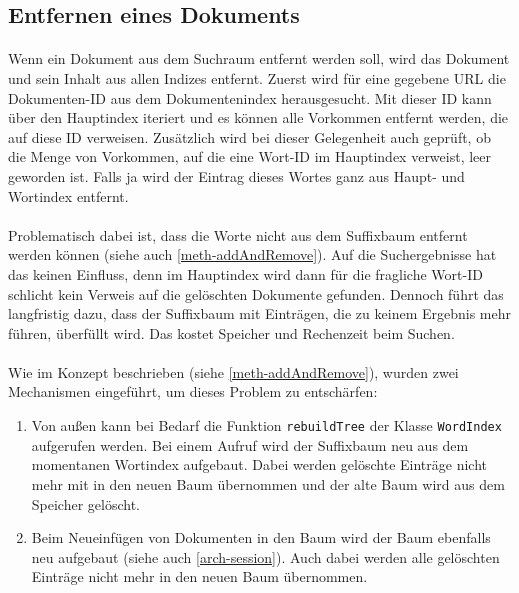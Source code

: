 \newpage

\subsection{Entfernen eines Dokuments}
\label{algo-removeDoc}

\paragraph{} Wenn ein Dokument aus dem Suchraum entfernt werden soll, wird das Dokument und sein Inhalt aus allen Indizes entfernt. Zuerst wird für eine gegebene URL die Dokumenten-ID aus dem Dokumentenindex herausgesucht. Mit dieser ID kann über den Hauptindex iteriert und es können alle Vorkommen entfernt werden, die auf diese ID verweisen. Zusätzlich wird bei dieser Gelegenheit auch geprüft, ob die Menge von Vorkommen, auf die eine Wort-ID im Hauptindex verweist, leer geworden ist. Falls ja wird der Eintrag dieses Wortes ganz aus Haupt- und Wortindex entfernt.
\paragraph{} Problematisch dabei ist, dass die Worte nicht aus dem Suffixbaum entfernt werden können (siehe auch \ref{meth-addAndRemove}). Auf die Suchergebnisse hat das keinen Einfluss, denn im Hauptindex wird dann für die fragliche Wort-ID schlicht kein Verweis auf die gelöschten Dokumente gefunden. Dennoch führt das langfristig dazu, dass der Suffixbaum mit Einträgen, die zu keinem Ergebnis mehr führen, überfüllt wird. Das kostet Speicher und Rechenzeit beim Suchen.
\paragraph{} Wie im Konzept beschrieben (siehe \ref{meth-addAndRemove}), wurden zwei Mechanismen eingeführt, um dieses Problem zu entschärfen:
\begin{enumerate}
 \item Von außen kann bei Bedarf die Funktion \texttt{rebuildTree} der Klasse \texttt{WordIndex} aufgerufen werden. Bei einem Aufruf wird der Suffixbaum neu aus dem momentanen Wortindex aufgebaut. Dabei werden  gelöschte Einträge nicht mehr mit in den neuen Baum übernommen und der alte Baum wird aus dem Speicher gelöscht.
 \item Beim Neueinfügen von Dokumenten in den Baum wird der Baum ebenfalls neu aufgebaut (siehe auch \ref{arch-session}). Auch dabei werden alle gelöschten Einträge nicht mehr in den neuen Baum übernommen.
\end{enumerate}